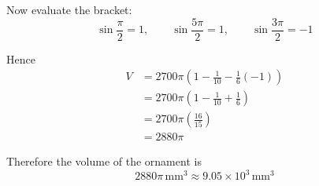 \documentclass[leqno]{article}
\begin{document}
\begin{enumerate}[
  label=\textbf{\arabic*.},
  leftmargin=*,
  topsep=0pt,
  partopsep=0pt,
  parsep=0pt
]
\begin{djsSolution}
\begin{enumerate}[label=\textbf{(\alph*)}]
Now evaluate the bracket:
\[
\sin\frac{\pi}{2}=1,\qquad \sin\frac{5\pi}{2}=1,\qquad \sin\frac{3\pi}{2}=-1
\]

Hence
\begin{align*}
V&=2700\pi\left(1-\frac{1}{10}-\frac{1}{6}(-1)\right)\\
&=2700\pi\left(1-\frac{1}{10}+\frac{1}{6}\right)\\
&=2700\pi\left(\frac{16}{15}\right)\\
&=2880\pi
\end{align*}

Therefore the volume of the ornament is
\[
2880\pi\,\mathrm{mm}^3\approx 9.05\times 10^3\,\mathrm{mm}^3
\]
  \end{enumerate}
\end{djsSolution}


\end{enumerate}
\end{document}
